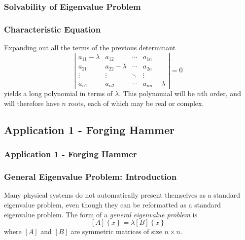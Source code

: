 \documentclass[fleqn]{beamer} %
\newcommand{\sectionIIsubsectionIItitle}{Solvability of Eigenvalue Problem}
\newcommand{\sectionIIsubsectionIIItitle}{Application 1 - Forging Hammer}
\begin{document}
			\begin{frame}
				\frametitle{\sectionIIsubsectionIItitle} \small
				\bigskip

				 \frametitle{Characteristic Equation}
  
				  Expanding out all the terms of the previous determinant
				  \begin{displaymath}
				    \left| \begin{array}{cccc}
				        a_{11}-\lambda & a_{12} & \cdots & a_{1n} \\
				        a_{21} & a_{22}-\lambda & \cdots & a_{2n} \\
				        \vdots & \vdots & \ddots & \vdots \\
				        a_{n1} & a_{n2} & \cdots & a_{nn}-\lambda
				      \end{array} \right| = 0
				  \end{displaymath}
				  yields a long polynomial in terms of $\lambda$. This polynomial will
				  be $n$th order, and will therefore have $n$ roots, each of which may
				  be real or complex.

				\btVFill
			\end{frame}		


		\subsection{\sectionIIsubsectionIIItitle}\label{sectionIIsubsectionIII}

			\begin{frame}
				\frametitle{\sectionIIsubsectionIIItitle} \small
				\bigskip

				\frametitle{General Eigenvalue Problem: Introduction}
  
				Many physical systems do not automatically present themselves as a
				standard eigenvalue problem, even though they can be reformatted as
				a standard eigenvalue problem. The form of a \emph{general
				eigenvalue problem} is
				\begin{displaymath}
				\left[ A \right] \left\{ x \right\} = \lambda \left[ B \right] \left\{ x \right\}
				\end{displaymath}
				where $[A]$ and $[B]$ are symmetric matrices of size $n \times n$.
							
				\btVFill 
			\end{frame}
\end{document}
